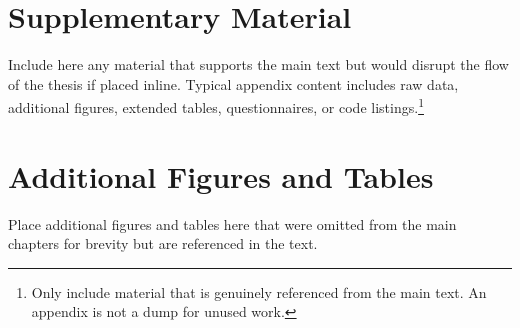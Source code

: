 \chapter{Supplementary Material}
\label{app:supplementary}

Include here any material that supports the main text but would disrupt the flow of the thesis if placed inline. Typical appendix content includes raw data, additional figures, extended tables, questionnaires, or code listings.\footnote{Only include material that is genuinely referenced from the main text. An appendix is not a dump for unused work.}

\chapter{Additional Figures and Tables}
\label{app:figures-tables}

Place additional figures and tables here that were omitted from the main chapters for brevity but are referenced in the text.
